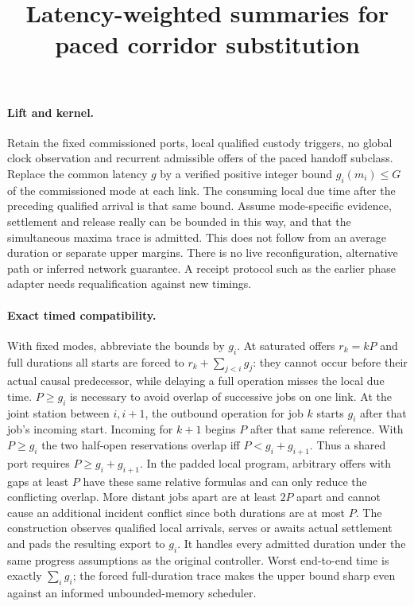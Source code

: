 \documentclass[11pt]{article}
\title{Latency-weighted summaries for paced corridor substitution}
\begin{document}
\maketitle
\paragraph{Lift and kernel.}
Retain the fixed commissioned ports, local qualified custody triggers,
no global clock observation and recurrent admissible offers of the
paced handoff subclass. Replace the common latency \(g\) by a verified
positive integer bound \(g_i(m_i)\le G\) of the commissioned mode
at each link. The consuming local due time after the
preceding qualified arrival is that same bound. Assume mode-specific
evidence, settlement and release really can be bounded in this way,
and that the simultaneous maxima trace is admitted. This does not
follow from an average duration or separate upper margins.
There is no live reconfiguration, alternative path or inferred
network guarantee. A receipt protocol such as the earlier phase
adapter needs requalification against new timings.

\paragraph{Exact timed compatibility.}
With fixed modes, abbreviate the bounds by \(g_i\). At saturated
offers \(r_k=kP\) and full durations all starts are forced to
\(r_k+\sum_{j<i}g_j\): they cannot occur before their actual causal
predecessor, while delaying a full operation misses the local due
time. \(P\ge g_i\) is necessary to avoid overlap of successive jobs
on one link. At the joint station between \(i,i+1\), the outbound
operation for job \(k\) starts \(g_i\) after that job's incoming
start. Incoming for \(k+1\) begins \(P\) after that same reference.
With \(P\ge g_i\) the two half-open reservations overlap iff
\(P<g_i+g_{i+1}\). Thus a shared port requires
\(P\ge g_i+g_{i+1}\). In the padded local program, arbitrary offers
with gaps at least \(P\) have these same relative formulas and can
only reduce the conflicting overlap. More distant jobs apart are
at least \(2P\) apart and cannot cause an additional incident
conflict since both durations are at most \(P\). The construction
observes qualified local arrivals, serves or awaits actual
settlement and pads the resulting export to \(g_i\). It handles
every admitted duration under the same progress assumptions as
the original controller. Worst end-to-end time is exactly
\(\sum_i g_i\); the forced full-duration trace makes the upper
bound sharp even against an informed unbounded-memory scheduler.
\end{document}
